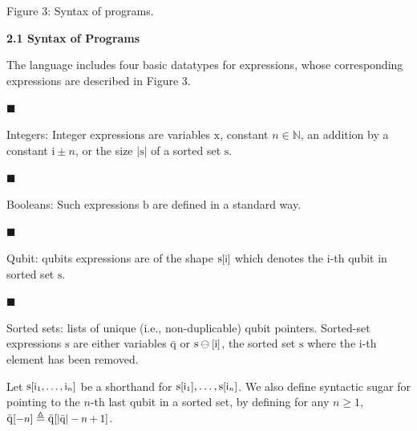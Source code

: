 \documentclass[10pt,a4paper]{amsart}
\begin{document}
Figure 3: Syntax of programs.\par
 
 
 
\par\medskip\noindent\textbf{2.1 Syntax of Programs}\par
 
 
The language includes four basic datatypes for expressions, whose corresponding expressions are described in Figure 3.\par
  
\par\noindent  $\blacksquare$ 
 
Integers: Integer expressions are variables $\mathrm{x}$, constant $n\in\mathbb{N}$, an addition by a constant $\mathrm{i}\pm n$, or the size $|\mathrm{s}|$ of a sorted set $\mathrm{s}$.\par
 
 
 
\par\noindent  $\blacksquare$ 
 
Booleans: Such expressions $\mathrm{b}$ are defined in a standard way.\par
 
 
 
\par\noindent  $\blacksquare$ 
 
Qubit: qubits expressions are of the shape $\mathrm{s}\textnormal{\small[$\mathrm{i}$]}$ which denotes the $\mathrm{i}$-th qubit in sorted set $\mathrm{s}$.\par
 
 
 
\par\noindent  $\blacksquare$ 
 
Sorted sets: lists of unique (i.e., non-duplicable) qubit pointers. Sorted-set expressions $\mathrm{s}$ are either variables $\bar{\mathrm{q}}$ or $\mathrm{s}\ominus\textnormal{\small[$\mathrm{i}$]}$, the sorted set $\mathrm{s}$ where the $\mathrm{i}$-th element has been removed.\par
 
 
  
Let $\mathrm{s}\textnormal{\small[$\mathrm{i}_{1},\ldots,\mathrm{i}_{n}$]}$ be a shorthand for $\mathrm{s}\textnormal{\small[$\mathrm{i}_{1}$]},\ldots,\mathrm{s}\textnormal{%
\small[$\mathrm{i}_{n}$]}$. We also define syntactic sugar for pointing to the $n$-th last qubit in a sorted set, by defining for any $n\geq 1$, $\bar{\mathrm{q}}\textnormal{\small[$-n$]}\triangleq\bar{\mathrm{q}}\textnormal%
{\small[$|\bar{\mathrm{q}}|-n+1$]}$.\par
 
\end{document}
